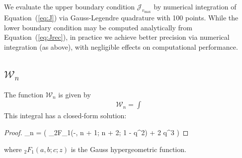 \documentclass[modern]{aastex62}
\newcommand{\BS}[1]{\ensuremath{\boldsymbol{#1}}}
\newcommand{\STARRYQUADPOINTS}{100\xspace}
\newcommand{\bkappa}{\BS{\kappa}}
\newcommand{\vmax}{{v_\mathrm{max}}}
\begin{document}
We evaluate the upper boundary condition $\mathcal{J}_{\vmax}$ by numerical
integration of Equation~(\ref{eq:J}) via Gauss-Legendre quadrature with
\STARRYQUADPOINTS points. While the lower boundary condition may be computed
analytically from Equation~(\ref{eq:Jrec}),
in practice we achieve better precision via numerical
integration (as above), with negligible effects on computational performance.

\subsection{$\mathcal{W}_n$}
%
The function $\mathcal{W}_n$ is given by
%
\begin{align}
    \label{eq:W}
    \mathcal{W}_n = \int
\end{align}
%
This integral has a closed-form solution:
%
\begin{proof}{}
    \label{eq:Wsol}
    _n =
    \frac{\sin^{2n + 2}\left(\frac{\bkappa}{2}\right)}{2n + 5}
    \left(
        {_2F_1}\left(-, n + 1; n + 2; 1 - q^2\right) + 2 q^3
    \right)
\end{proof}
%
where ${_2F_1}(a, b; c; z)$ is the Gauss hypergeometric function.




\end{document}
